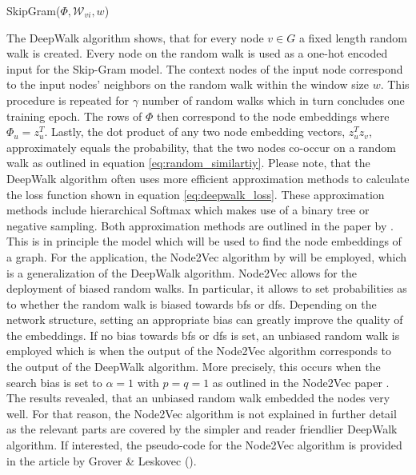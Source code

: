 	\begin{algorithm}[h]
		\scriptsize
		\SetAlgoLined
		\nl {}
		\caption[SkipGram]{SkipGram($\Phi,\mathcal{W}_{vi},w$)}
		\label{algo:SkipGram}
	\end{algorithm}
	
	\vspace{5mm}
	
	\noindent The DeepWalk algorithm shows, that for every node $v\in G$ a
	fixed length random walk is created. Every node on the random walk is used
	as a one-hot encoded input for the Skip-Gram model. The context nodes of the
	input node correspond to the input nodes' neighbors on the random walk 
	within the window size $w$. This procedure is repeated for $\gamma$ 
	number of random walks which in turn concludes one training epoch. The rows
	of $\Phi$ then correspond to the node embeddings where
	$\Phi_{u}=z_{u}^{T}$. Lastly, the dot product of any two node embedding
	vectors, $z_{u}^{T}z_{v}$, approximately equals the probability, that the
	two nodes co-occur on a random walk as outlined in equation 
	\ref{eq:random_similartiy}. Please note, that the DeepWalk algorithm often 
	uses more efficient approximation methods to calculate the loss function
	shown in equation \ref{eq:deepwalk_loss}. These approximation methods
	include hierarchical Softmax which makes use of a binary tree or negative 
	sampling. Both approximation methods are outlined in the paper by 
	\cite{mikolov2013distributed}. \\

	\noindent This is in principle the model which will be used to find the node
	embeddings of a graph. For the application, the Node2Vec algorithm by
	\cite{grover2016node2vec} will be employed, which is a generalization of 
	the DeepWalk algorithm. Node2Vec allows for the deployment of biased random 
	walks. In particular, it allows to set probabilities as to whether the 
	random walk is biased towards \ac{bfs} or \ac{dfs}. Depending on the network 
	structure, setting an appropriate bias can greatly improve the quality of the 
	embeddings. If no bias towards \ac{bfs} or \ac{dfs} is set, an unbiased 
	random walk is employed which is when the output of the Node2Vec algorithm 
	corresponds to the output of the DeepWalk algorithm. More precisely, this 
	occurs when the search bias is set to $\alpha = 1$ with $p=q=1$ as outlined 
	in the Node2Vec paper \citep[p. 860]{grover2016node2vec}. The results revealed, 
	that an unbiased random walk embedded the nodes very well. For that reason, 
	the Node2Vec algorithm is not explained in further detail as the relevant 
	parts are covered by the simpler and reader friendlier DeepWalk algorithm. If
	interested, the pseudo-code for the Node2Vec algorithm is provided in the 
	article by Grover \& Leskovec (\citeyear[p. 859]{grover2016node2vec}). \\

